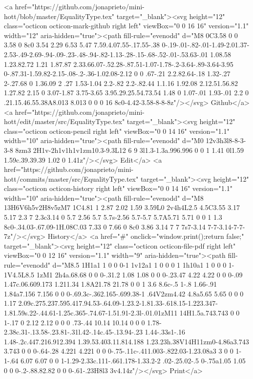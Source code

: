 {      <a href="https://github.com/jonaprieto/mini-hott/blob/master/EqualityType.tex" target="_blank"><svg height="12" class="octicon octicon-mark-github right left" viewBox="0 0 16 16" version="1.1" width="12" aria-hidden="true"><path fill-rule="evenodd" d="M8 0C3.58 0 0 3.58 0 8c0 3.54 2.29 6.53 5.47 7.59.4.07.55-.17.55-.38 0-.19-.01-.82-.01-1.49-2.01.37-2.53-.49-2.69-.94-.09-.23-.48-.94-.82-1.13-.28-.15-.68-.52-.01-.53.63-.01 1.08.58 1.23.82.72 1.21 1.87.87 2.33.66.07-.52.28-.87.51-1.07-1.78-.2-3.64-.89-3.64-3.95 0-.87.31-1.59.82-2.15-.08-.2-.36-1.02.08-2.12 0 0 .67-.21 2.2.82.64-.18 1.32-.27 2-.27.68 0 1.36.09 2 .27 1.53-1.04 2.2-.82 2.2-.82.44 1.1.16 1.92.08 2.12.51.56.82 1.27.82 2.15 0 3.07-1.87 3.75-3.65 3.95.29.25.54.73.54 1.48 0 1.07-.01 1.93-.01 2.2 0 .21.15.46.55.38A8.013 8.013 0 0 0 16 8c0-4.42-3.58-8-8-8z"/></svg> Github</a>
      <a href="https://github.com/jonaprieto/mini-hott/edit/master/src/EqualityType.tex" target="_blank"><svg height="12" class="octicon octicon-pencil right left" viewBox="0 0 14 16" version="1.1" width="10" aria-hidden="true"><path fill-rule="evenodd" d="M0 12v3h3l8-8-3-3-8 8zm3 2H1v-2h1v1h1v1zm10.3-9.3L12 6 9 3l1.3-1.3a.996.996 0 0 1 1.41 0l1.59 1.59c.39.39.39 1.02 0 1.41z"/></svg> Edit</a>
      <a href="https://github.com/jonaprieto/mini-hott/commits/master/src/EqualityType.tex" target="_blank"><svg height="12" class="octicon octicon-history right left" viewBox="0 0 14 16" version="1.1" width="10" aria-hidden="true"><path fill-rule="evenodd" d="M8 13H6V6h5v2H8v5zM7 1C4.81 1 2.87 2.02 1.59 3.59L0 2v4h4L2.5 4.5C3.55 3.17 5.17 2.3 7 2.3c3.14 0 5.7 2.56 5.7 5.7s-2.56 5.7-5.7 5.7A5.71 5.71 0 0 1 1.3 8c0-.34.03-.67.09-1H.08C.03 7.33 0 7.66 0 8c0 3.86 3.14 7 7 7s7-3.14 7-7-3.14-7-7-7z"/></svg> History</a>
      <a  href="#" onclick="window.print();return false;" target="_blank"><svg height="12" class="octicon octicon-file-pdf right left" viewBox="0 0 12 16" version="1.1" width="9" aria-hidden="true"><path fill-rule="evenodd" d="M8.5 1H1a1 1 0 0 0-1 1v12a1 1 0 0 0 1 1h10a1 1 0 0 0 1-1V4.5L8.5 1zM1 2h4a.68.68 0 0 0-.31.2 1.08 1.08 0 0 0-.23.47 4.22 4.22 0 0 0-.09 1.47c.06.609.173 1.211.34 1.8A21.78 21.78 0 0 1 3.6 8.6c-.5 1-.8 1.66-.91 1.84a7.156 7.156 0 0 0-.69.3c-.362.165-.699.38-1 .64V2zm4.42 4.8a5.65 5.65 0 0 0 1.17 2.09c.275.237.595.417.94.53-.64.09-1.23.2-1.81.33-.618.15-1.223.347-1.81.59s.22-.44.61-1.25c.365-.74.67-1.51.91-2.3l-.01.01zM11 14H1.5a.743.743 0 0 1-.17 0 2.12 2.12 0 0 0 .73-.44 10.14 10.14 0 0 0 1.78-2.38c.31-.13.58-.23.81-.31l.42-.14c.45-.13.94-.23 1.44-.33s1-.16 1.48-.2c.447.216.912.394 1.39.53.403.11.814.188 1.23.23h.38V14H11zm0-4.86a3.743 3.743 0 0 0-.64-.28 4.221 4.221 0 0 0-.75-.11c-.411.003-.822.03-1.23.08a3 3 0 0 1-1-.64 6.07 6.07 0 0 1-1.29-2.33c.111-.661.178-1.33.2-2 .02-.25.02-.5 0-.75a1.05 1.05 0 0 0-.2-.88.82.82 0 0 0-.61-.23H8l3 3v4.14z"/></svg> Print</a>
}
